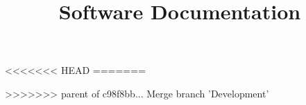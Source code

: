 \documentclass[	11pt
				DIV=11		
			]
			{article}
\title{Software Documentation}
\author{}
\begin{document}
 \noindent
	\maketitle
	\cleardoublepage
	\tableofcontents
	\cleardoublepage
	
	\pagebreak
	
<<<<<<< HEAD
=======
	
>>>>>>> parent of c98f8bb... Merge branch 'Development'
\end{document}
